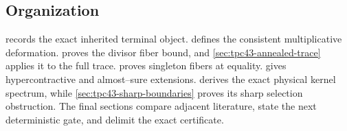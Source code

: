 \subsection{Organization}

 records the exact inherited terminal object.
 defines the consistent multiplicative
deformation.   proves the divisor fiber
bound, and \cref{sec:tpc43-annealed-trace} applies it to the full trace.
 proves singleton fibers at equality.
 gives hypercontractive and almost--sure
extensions.   derives the exact physical
kernel spectrum, while \cref{sec:tpc43-sharp-boundaries} proves its
sharp selection obstruction.  The final sections compare adjacent
literature, state the next deterministic gate, and delimit the exact
certificate.
